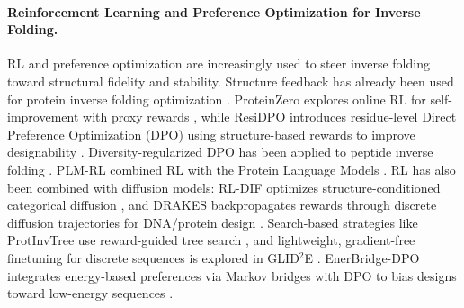 \paragraph{Reinforcement Learning and Preference Optimization for Inverse Folding.}
RL and preference optimization are increasingly used to steer inverse folding toward structural fidelity and stability. Structure feedback has already been used for protein inverse folding optimization \citep{xu2025proteininversefoldingstructure}. ProteinZero explores online RL for self-improvement with proxy rewards \citep{wang2025proteinzero}, while ResiDPO introduces residue-level Direct Preference Optimization (DPO) using structure-based rewards to improve designability \citep{xue2025improving}. Diversity-regularized DPO has been applied to peptide inverse folding \citep{park2024improving}. PLM-RL combined RL with the Protein Language Models \citep{cao2025supervisionexplorationdoesprotein}. RL has also been combined with diffusion models: RL-DIF optimizes structure-conditioned categorical diffusion \citep{ektefaie2024reinforcement}, and DRAKES backpropagates rewards through discrete diffusion trajectories for DNA/protein design \citep{wang2024fine}. Search-based strategies like ProtInvTree use reward-guided tree search \citep{liu2025protinvtree}, and lightweight, gradient-free finetuning for discrete sequences is explored in GLID$^2$E \citep{cao2025glid}. EnerBridge-DPO integrates energy-based preferences via Markov bridges with DPO to bias designs toward low-energy sequences \citep{rong2025enerbridge}.

